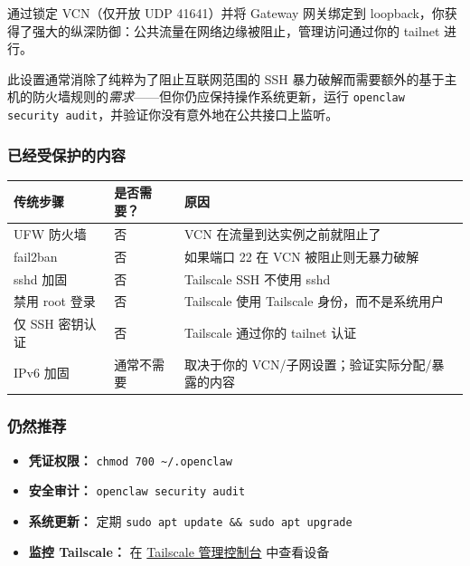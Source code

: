 通过锁定 VCN（仅开放 UDP 41641）并将 Gateway 网关绑定到 loopback，你获得了强大的纵深防御：公共流量在网络边缘被阻止，管理访问通过你的 tailnet 进行。

此设置通常消除了纯粹为了阻止互联网范围的 SSH 暴力破解而需要额外的基于主机的防火墙规则的\textit{需求}——但你仍应保持操作系统更新，运行 \texttt{openclaw security audit}，并验证你没有意外地在公共接口上监听。

\subsubsection{已经受保护的内容}



\begin{table}[h]
\centering
\small
\begin{tabular}{|l|l|l|}
\hline
传统步骤 & 是否需要？ & 原因 \\
\hline
UFW 防火墙 & 否 & VCN 在流量到达实例之前就阻止了 \\
\hline
fail2ban & 否 & 如果端口 22 在 VCN 被阻止则无暴力破解 \\
\hline
sshd 加固 & 否 & Tailscale SSH 不使用 sshd \\
\hline
禁用 root 登录 & 否 & Tailscale 使用 Tailscale 身份，而不是系统用户 \\
\hline
仅 SSH 密钥认证 & 否 & Tailscale 通过你的 tailnet 认证 \\
\hline
IPv6 加固 & 通常不需要 & 取决于你的 VCN/子网设置；验证实际分配/暴露的内容 \\
\hline
\end{tabular}
\end{table}



\subsubsection{仍然推荐}


\begin{itemize}
  \item \textbf{凭证权限：} \texttt{chmod 700 \textasciitilde{}/.openclaw}
  \item \textbf{安全审计：} \texttt{openclaw security audit}
  \item \textbf{系统更新：} 定期 \texttt{sudo apt update \&\& sudo apt upgrade}
  \item \textbf{监控 Tailscale：} 在 \href{https://login.tailscale.com/admin}{Tailscale 管理控制台} 中查看设备
\end{itemize}


